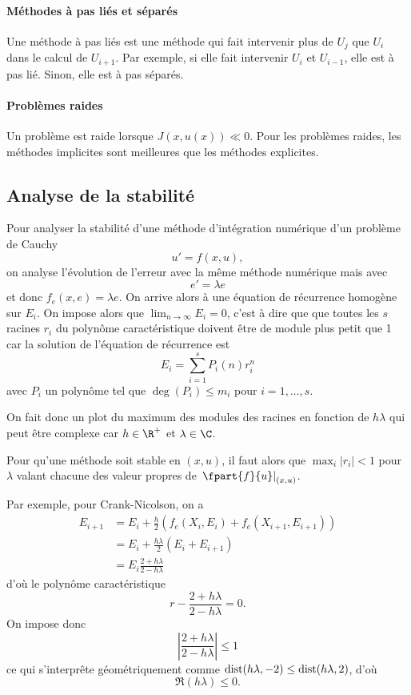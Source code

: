 \paragraph{Méthodes à pas liés et séparés}
Une méthode à pas liés est une méthode qui fait intervenir
plus de $U_j$ que $U_i$ dans le calcul de $U_{i+1}$.
Par exemple, si elle fait intervenir $U_i$ et $U_{i-1}$, elle
est à pas lié.
Sinon, elle est à pas séparés.

\paragraph{Problèmes raides}
Un problème est raide lorsque $J(x, u(x)) \ll 0$.
Pour les problèmes raides, les méthodes implicites sont meilleures que les
méthodes explicites.

\subsection{Analyse de la stabilité}
Pour analyser la stabilité d'une méthode d'intégration numérique d'un
problème de Cauchy
\[ u' = f(x, u), \]
on analyse l'évolution de l'erreur avec la même méthode
numérique mais avec
\[ e' = \lambda e \]
et donc $f_e(x, e) = \lambda e$.
On arrive alors à une équation de récurrence homogène sur $E_i$.
On impose alors que $\lim_{n \to \infty} E_i = 0$, c'est à dire que
que toutes les $s$ racines $r_i$ du polynôme caractéristique doivent être de module plus petit que 1
car la solution de l'équation de récurrence est
\[ E_i = \sum_{i = 1}^s P_i(n)r_i^n \]
avec $P_i$ un polynôme tel que
$\deg(P_i) \leq m_i$ pour $i = 1, \ldots, s$.

On fait donc un plot du maximum des modules des racines en fonction de $h\lambda$ qui peut
être complexe car $h \in \R^+$ et $\lambda \in \C$.

Pour qu'une méthode soit stable en $(x, u)$,
il faut alors que $\max_i |r_i| < 1$ pour
$\lambda$ valant chacune des valeur
propres de $\left.\fpart{f}{u}\right|_{(x,u)}$.

\begin{myexem}
  Par exemple, pour Crank-Nicolson, on a
  \begin{align*}
    E_{i+1} & = E_i + \frac{h}{2} (f_e(X_i, E_i) + f_e(X_{i+1}, E_{i+1}))\\
            & = E_i + \frac{h\lambda}{2} (E_i + E_{i+1})\\
            & = E_i \frac{2 + h\lambda}{2 - h\lambda}
  \end{align*}
  d'où le polynôme caractéristique
  \[ r - \frac{2 + h\lambda}{2 - h\lambda} = 0. \]
  On impose donc
  \[ \left|\frac{2 + h\lambda}{2 - h\lambda}\right| \leq 1 \]
  ce qui s'interprête géométriquement comme
  $\operatorname{dist}(h\lambda, -2) \leq \operatorname{dist}(h\lambda, 2)$, d'où
  \[ \Re(h\lambda) \leq 0. \]
\end{myexem}

